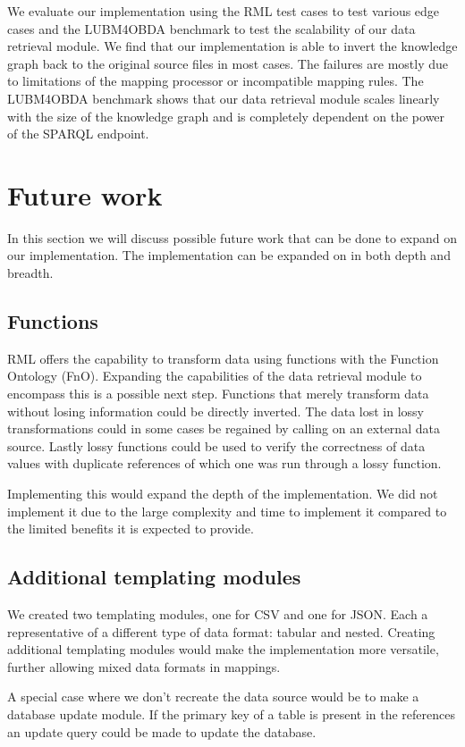 We evaluate our implementation using the RML test cases to test various edge cases and the LUBM4OBDA benchmark to test the scalability of our data retrieval module. We find that our implementation is able to invert the knowledge graph back to the original source files in most cases. The failures are mostly due to limitations of the mapping processor or incompatible mapping rules. The LUBM4OBDA benchmark shows that our data retrieval module scales linearly with the size of the knowledge graph and is completely dependent on the power of the SPARQL endpoint.

\section{Future work}
In this section we will discuss possible future work that can be done to expand on our implementation. The implementation can be expanded on in both depth and breadth. 

\subsection{Functions}
RML offers the capability to transform data using functions with the Function Ontology (FnO). Expanding the capabilities of the data retrieval module to encompass this is a possible next step. Functions that merely transform data without losing information could be directly inverted. The data lost in lossy transformations could in some cases be regained by calling on an external data source. Lastly lossy functions could be used to verify the correctness of data values with duplicate references of which one was run through a lossy function.

Implementing this would expand the depth of the implementation. We did not implement it due to the large complexity and time to implement it compared to the limited benefits it is expected to provide.

\subsection{Additional templating modules}
We created two templating modules, one for CSV and one for JSON. Each a representative of a different type of data format: tabular and nested. Creating additional templating modules would make the implementation more versatile, further allowing mixed data formats in mappings. 

A special case where we don't recreate the data source would be to make a database update module. If the primary key of a table is present in the references an update query could be made to update the database. 